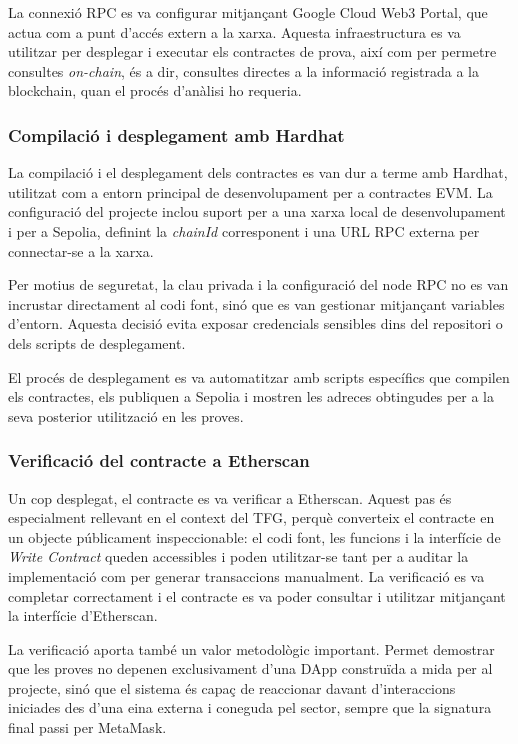 La connexió RPC es va configurar mitjançant Google Cloud Web3 Portal, que actua com a punt d’accés extern a la xarxa. Aquesta infraestructura es va utilitzar per desplegar i executar els contractes de prova, així com per permetre consultes \textit{on-chain}, és a dir, consultes directes a la informació registrada a la blockchain, quan el procés d’anàlisi ho requeria.

\subsubsection{Compilació i desplegament amb Hardhat}

La compilació i el desplegament dels contractes es van dur a terme amb Hardhat, utilitzat com a entorn principal de desenvolupament per a contractes EVM. La configuració del projecte inclou suport per a una xarxa local de desenvolupament i per a Sepolia, definint la \textit{chainId} corresponent i una URL RPC externa per connectar-se a la xarxa.

Per motius de seguretat, la clau privada i la configuració del node RPC no es van incrustar directament al codi font, sinó que es van gestionar mitjançant variables d’entorn. Aquesta decisió evita exposar credencials sensibles dins del repositori o dels scripts de desplegament.

El procés de desplegament es va automatitzar amb scripts específics que compilen els contractes, els publiquen a Sepolia i mostren les adreces obtingudes per a la seva posterior utilització en les proves.

\subsubsection{Verificació del contracte a Etherscan}

Un cop desplegat, el contracte es va verificar a Etherscan. Aquest pas és especialment rellevant en el context del TFG, perquè converteix el contracte en un objecte públicament inspeccionable: el codi font, les funcions i la interfície de \textit{Write Contract} queden accessibles i poden utilitzar-se tant per a auditar la implementació com per generar transaccions manualment. La verificació es va completar correctament i el contracte es va poder consultar i utilitzar mitjançant la interfície d’Etherscan.


La verificació aporta també un valor metodològic important. Permet demostrar que les proves no depenen exclusivament d’una DApp construïda a mida per al projecte, sinó que el sistema és capaç de reaccionar davant d’interaccions iniciades des d’una eina externa i coneguda pel sector, sempre que la signatura final passi per MetaMask.



